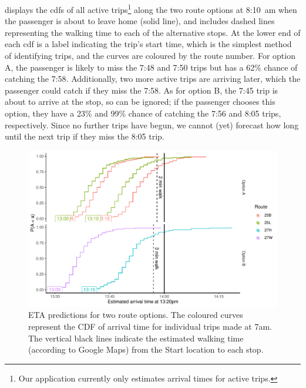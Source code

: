  displays the \glspl{cdf} of all active trips\footnote{Our application currently only estimates arrival times for active trips.} along the two route options at 8:10~am when the passenger is about to leave home (solid line), and includes dashed lines representing the walking time to each of the alternative stops. At the lower end of each \gls{cdf} is a label indicating the trip's start time, which is the simplest method of identifying trips, and the curves are coloured by the route number. For option A, the passenger is likely to miss the 7:48 and 7:50 trips but has a 62\% chance of catching the 7:58. Additionally, two more active trips are arriving later, which the passenger could catch if they miss the 7:58. As for option B, the 7:45 trip is about to arrive at the stop, so can be ignored; if the passenger chooses this option, they have a 23\% and 99\% chance of catching the 7:56 and 8:05 trips, respectively. Since no further trips have begun, we cannot (yet) forecast how long until the next trip if they miss the 8:05 trip.



\begin{knitrout}
\color{fgcolor}\begin{figure}

{\centering \includegraphics[width=\textwidth]{figure/eta_journey_arriveby-1} 

}

\caption[ETA predictions for two route options]{ETA predictions for two route options. The coloured curves represent the CDF of arrival time for individual trips made at 7am. The vertical black lines indicate the estimated walking time (according to Google Maps) from the Start location to each stop.}\label{fig:eta_journey_arriveby}
\end{figure}


\end{knitrout}

